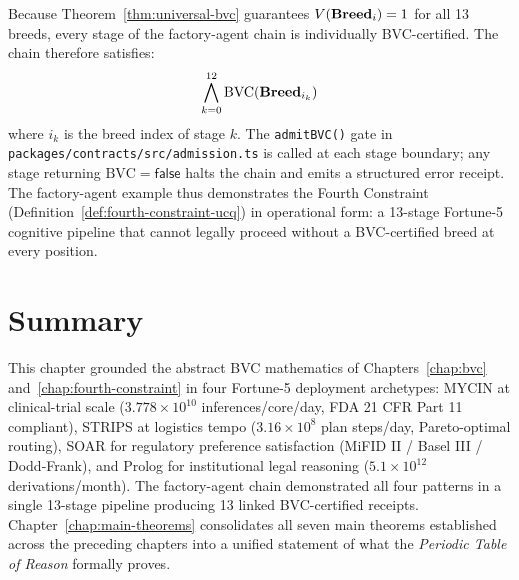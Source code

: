 Because Theorem~\ref{thm:universal-bvc} guarantees $V(\mathbf{Breed}_i) = 1$ for all 13 breeds,
every stage of the factory-agent chain is individually BVC-certified. The chain therefore
satisfies:
\[
  \bigwedge_{k=0}^{12} \mathrm{BVC}(\mathbf{Breed}_{i_k})
\]
where $i_k$ is the breed index of stage $k$. The \texttt{admitBVC()} gate in
\texttt{packages/contracts/src/admission.ts} is called at each stage boundary; any stage
returning $\mathrm{BVC} = \mathsf{false}$ halts the chain and emits a structured error
receipt. The factory-agent example thus demonstrates the Fourth Constraint
(Definition~\ref{def:fourth-constraint-ucq}) in operational form: a 13-stage Fortune-5
cognitive pipeline that cannot legally proceed without a BVC-certified breed at every
position.

\section{Summary}
\label{sec:fortune5-summary}

This chapter grounded the abstract BVC mathematics of Chapters~\ref{chap:bvc}
and~\ref{chap:fourth-constraint} in four Fortune-5 deployment archetypes: MYCIN at
clinical-trial scale ($3.778 \times 10^{10}$ inferences/core/day, FDA 21 CFR Part 11
compliant), STRIPS at logistics tempo ($3.16 \times 10^8$ plan steps/day, Pareto-optimal
routing), SOAR for regulatory preference satisfaction (MiFID II / Basel III / Dodd-Frank),
and Prolog for institutional legal reasoning ($5.1 \times 10^{12}$ derivations/month).
The factory-agent chain demonstrated all four patterns in a single 13-stage pipeline
producing 13 linked BVC-certified receipts. Chapter~\ref{chap:main-theorems} consolidates
all seven main theorems established across the preceding chapters into a unified
statement of what the \emph{Periodic Table of Reason} formally proves.
